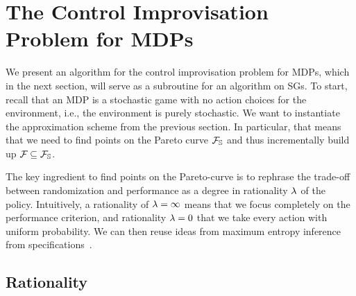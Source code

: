 \section{The Control Improvisation Problem for MDPs}
\label{sec:mdps}

We present an algorithm for the control improvisation problem for
MDPs, which in the next section, will serve as a subroutine for an algorithm
on SGs. To start, recall that an MDP is a stochastic game with no action choices for the environment, i.e., the environment is purely stochastic. 
We want to instantiate the approximation scheme from the previous section. In particular, that means that we need to find points on the Pareto curve $\mathcal{F}_{\mathbb{S}}$ and thus incrementally build up $\mathcal{F}_{} \subseteq \mathcal{F}_{\mathbb{S}}$. 

The
key ingredient to find points on the Pareto-curve is to rephrase the trade-off between randomization and
performance as a degree in rationality $\lambda$ of the
policy. Intuitively, a rationality of $\lambda = \infty$ means that we
focus completely on the performance criterion, and rationality $\lambda =
0$ that we take every action with uniform probability. We can then reuse ideas from maximum entropy inference from
specifications~\cite{DBLP:conf/cav/Vazquez-Chanlatte20}.

\subsection{Rationality}

